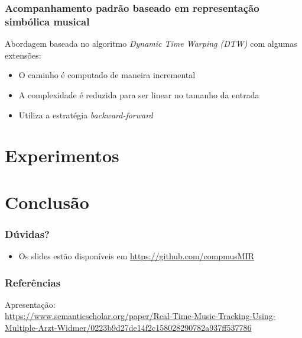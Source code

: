 \documentclass[serif,mathserif]{beamer}
\begin{document}
\begin{frame}
  \frametitle{Acompanhamento padrão baseado em representação simbólica musical}
  Abordagem baseada no algoritmo \emph{Dynamic Time Warping (DTW)} com algumas extensões:\pause %
  \begin{itemize}
    \item O caminho é computado de maneira incremental\\\pause
    \item A complexidade é reduzida para ser linear no tamanho da entrada\pause
    \item Utiliza a estratégia \emph{backward-forward} %
  \end{itemize}
\end{frame}

\section{Experimentos}
\section{Conclusão}

\begin{frame}
  \frametitle{Dúvidas?}
  \begin{itemize}
    \item Os slides estão disponíveis em \url{https://github.com/compmusMIR}
  \end{itemize}
\end{frame}

\begin{frame}
  \frametitle{Referências}
  \small
  Apresentação:\\
  \vspace{2mm}
  \url{https://www.semanticscholar.org/paper/Real-Time-Music-Tracking-Using-Multiple-Arzt-Widmer/0223b9d27de14f2c158028290782a937ff537786}


\end{frame}
\end{document}
